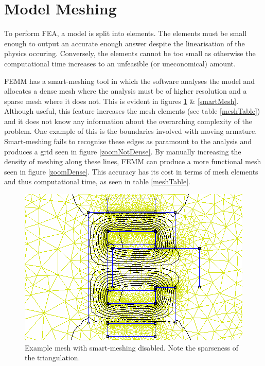 \documentclass[a4paper]{IEEEtran}
\begin{document}
\section{Model Meshing}
To perform FEA, a model is split into elements. The elements must be small enough to output an accurate enough answer despite the linearisation of the physics occuring. Conversely, the elements cannot be too small as otherwise the computational time increases to an unfeasible (or uneconomical) amount.

FEMM has a smart-meshing tool in which the software analyses the model and allocates a dense mesh where the analysis must be of higher resolution and a sparse mesh where it does not. This is evident in figures \ref{noSmartMesh} \& \ref{smartMesh}. Although useful, this feature increases the mesh elements (see table \ref{meshTable}) and it does not know any information about the overarching complexity of the problem. One example of this is the boundaries involved with moving armature. Smart-meshing fails to recognise these edges as paramount to the analysis and produces a grid seen in figure \ref{zoomNotDense}. By manually increasing the density of meshing along these lines, FEMM can produce a more functional mesh seen in figure \ref{zoomDense}. This accuracy has its cost in terms of mesh elements and thus computational time, as seen in table \ref{meshTable}.

\begin{figure}[ht]
\includegraphics[width = \linewidth]{Smartmesh-OFF-NotDenseAirgap.png}
\caption{Example mesh with smart-meshing disabled. Note the sparseness of the triangulation.}
\label{noSmartMesh} 
\end{figure}
\end{document}
